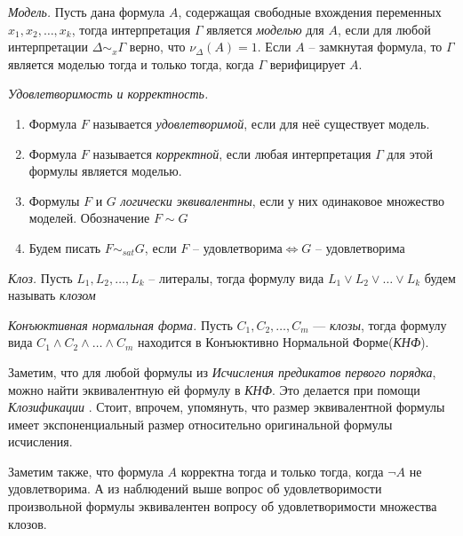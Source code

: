 \begin{definition}
  \emph{Модель.} Пусть дана формула $A$, содержащая свободные вхождения переменных $x_1, x_2, \ldots, x_k$, тогда интерпретация $\Gamma$ является \textit{моделью} для $A$, если для любой интерпретации $\Delta \sim_x \Gamma$ верно, что $\nu_{\Delta}(A) = 1$. Если $A$ -- замкнутая формула, то $\Gamma$ является моделью тогда и только тогда, когда $\Gamma$ верифицирует $A$.
\end{definition}

\begin{definition}
  \emph{Удовлетворимость и корректность.} 
  \begin{enumerate}
  	\item Формула $F$ называется \textit{удовлетворимой}, если для неё существует модель.
  	\item Формула $F$ называется \textit{корректной}, если любая интерпретация $\Gamma$ для этой формулы является моделью.
  	\item Формулы $F$ и $G$ \textit{логически эквивалентны}, если у них одинаковое множество моделей. Обозначение $F \sim G$
  	\item Будем писать $F \sim_{sat} G$, если $F \text{ -- удовлетворима} \iff G \text{ -- удовлетворима}$
  \end{enumerate}
\end{definition}

\begin{definition}
  \emph{Клоз.} Пусть $L_1, L_2, \ldots, L_k$ -- литералы, тогда формулу вида $L_1 \vee L_2 \vee \dots \vee L_k$ будем называть \emph{клозом}
\end{definition}

\begin{definition}
  \emph{Конъюктивная нормальная форма.} Пусть $C_1, C_2, \ldots, C_m$ --- \emph{клозы}, тогда формулу вида $C_1 \wedge C_2 \wedge \dots \wedge C_m$ находится в Конъюктивно Нормальной Форме(\emph{КНФ}).
\end{definition}

Заметим, что для любой формулы из \emph{Исчисления предикатов первого порядка}, можно найти эквивалентную ей формулу в \emph{КНФ}. Это делается при помощи \textit{Клозификации} \cite{clausification}. Стоит, впрочем, упомянуть, что размер эквивалентной формулы имеет экспоненциальный размер относительно оригинальной формулы исчисления.

Заметим также, что формула $A$ корректна тогда и только тогда, когда $\neg A$ не удовлетворима. А из наблюдений выше вопрос об удовлетворимости произвольной формулы эквивалентен вопросу об удовлетворимости множества клозов. 


